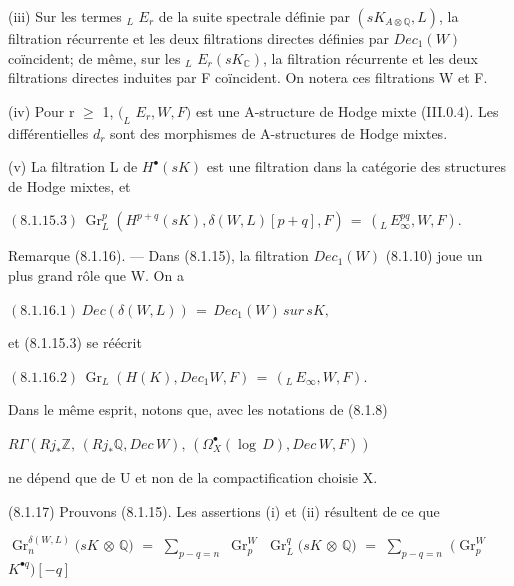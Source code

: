 \documentclass[11pt,twoside]{article}
\newcommand{\DFormula}[1]{%
  \par\smallskip\noindent\hspace*{0pt}\(\displaystyle #1\)\par\smallskip
}
\begin{document}
(iii) Sur les termes \(_{L}\) \(E_{r}\) de la suite spectrale définie par \((sK_{A\otimes \mathbb{Q}},L)\), la filtration récurrente et les deux filtrations directes définies par \(Dec_{1}(W)\) coïncident; de même, sur les \(_{L}\) \(E_{r}(sK_{\mathbb{C}})\), la filtration récurrente et les deux filtrations directes induites par F coïncident. On notera ces filtrations W et F.\par
\par\medskip
(iv) Pour r \(\geq \) 1, \((_{L}\) \(E_{r},W,F)\) est une A-structure de Hodge mixte (III.0.4). Les différentielles \(d_{r}\) sont des morphismes de A-structures de Hodge mixtes.\par
\par\medskip
(v) La filtration L de \(H^{\bullet }(sK)\) est une filtration dans la catégorie des structures de Hodge mixtes, et\par
\par\medskip
\DFormula{(8.1.15.3)\,\operatorname{Gr}_{L}^{p}(H^{p+q}(sK),\delta (W,L)[p+q],F)\,=\,(_{L}\,E_{\infty }^{pq},W,F).}
\par\medskip
Remarque (8.1.16). — Dans (8.1.15), la filtration \(Dec_{1}(W)\) (8.1.10) joue un plus grand rôle que W. On a\par
\par\medskip
\DFormula{(8.1.16.1)\,Dec(\delta (W,L))\,=\,Dec_{1}(W)\,sur\,sK,}
\par\medskip
et (8.1.15.3) se réécrit\par
\par\medskip
\DFormula{(8.1.16.2)\,\operatorname{Gr}_{L}(H(K),Dec_{1}W,F)\,=\,(_{L}\,E_{\infty },W,F).}
\par\medskip
Dans le même esprit, notons que, avec les notations de (8.1.8)\par
\par\medskip
\DFormula{R\Gamma (Rj_{\ast }\mathbb{Z},\,(Rj_{\ast }\mathbb{Q},Dec\,W),\,(\Omega _{X}^{\bullet }(\operatorname{log}\,D),Dec\,W,F))}
\par\medskip
ne dépend que de U et non de la compactification choisie X.\par
\par\medskip
(8.1.17) Prouvons (8.1.15). Les assertions (i) et (ii) résultent de ce que\par
\par\medskip
\(\operatorname{Gr}_{n}^{\delta (W,L)}(sK\) \(\otimes \) \(\mathbb{Q})\) \(=\) \(\sum _{p−q=n}\) \(\operatorname{Gr}_{p}^{W}\) \(\operatorname{Gr}_{L}^{q}(sK\) \(\otimes \) \(\mathbb{Q})\) \(=\) \(\sum _{p−q=n}\) \((\operatorname{Gr}_{p}^{W}\) \(K^{\bullet q})[−q]\)\par
\end{document}
